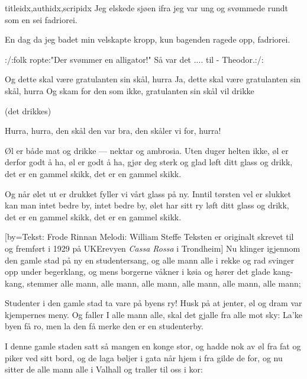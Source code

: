 \documentclass[14pt,letterpaper,norsk]{article}
\begin{document}
\begin{songs}{titleidx,authidx,scripidx}
\beginverse
Jeg elskede sjøen ifra jeg var ung
og svømmede rundt som en sei
fadriorei.
\endverse

\beginverse
En dag da jeg badet min velskapte kropp,
kun bagenden ragede opp,
fadriorei.
\endverse

\beginverse
:/:folk ropte:"Der svømmer en alligator!"
Så var det .... til - Theodor.:/:
\endverse
\endsong

\beginverse
Og dette skal være gratulanten sin skål, hurra
Ja, dette skal være gratulanten sin skål, hurra
Og skam for den som ikke, gratulanten sin skål vil drikke

(det drikkes)

Hurra, hurra, den skål den var bra, den skåler vi for, hurra!
\endverse
\endsong

\beginverse
Øl er både mat og drikke --- nektar og ambrosia.
Uten duger helten ikke, øl er derfor godt å ha,
øl er godt å ha, gjør deg sterk og glad
løft ditt glass og drikk, det er en gammel skikk,
det er en gammel skikk.
\endverse

\beginverse
Og når ølet ut er drukket fyller vi vårt glass på ny.
Inntil tørsten vel er slukket kan man intet bedre by,
intet bedre by, ølet har sitt ry
løft ditt glass og drikk, det er en gammel skikk,
det er en gammel skikk.
\endverse
\endsong

[by={Tekst: Frode Rinnan \newline Melodi: William Steffe
\newline Teksten er originalt skrevet til og fremført i 1929 på UKErevyen \textit{Cassa Rossa} i Trondheim}]
\beginverse
Nu klinger igjennom den gamle stad på ny en studentersang,
og alle mann alle i rekke og rad svinger opp under begerklang,
og mens borgerne våkner i køia og hører det glade kang-kang,
stemmer alle mann, alle mann, alle mann, alle mann, alle mann, alle mann;
\endverse

\beginchorus
Studenter i den gamle stad ta vare på byens ry!
Husk på at jenter, øl og dram var kjempernes meny.
Og faller I alle mann alle, skal det gjalle fra alle mot sky:
La'ke byen få ro, men la den få merke den er en studenterby.
\endchorus

\beginverse
I denne gamle staden satt så mangen en konge stor,
og hadde nok av øl fra fat og piker ved sitt bord,
og de laga bøljer i gata når hjem i fra gilde de for,
og nu sitter de alle mann alle i Valhall og traller til oss i kor:
\endverse


\end{songs}
\end{document}
